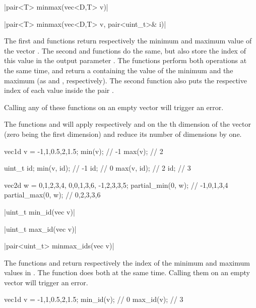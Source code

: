\cppinline|pair<T> minmax(vec<D,T> v)| 

\cppinline|pair<T> minmax(vec<D,T> v, pair<uint_t>& i)|

The first  and  functions return respectively the minimum and maximum value of the vector . The second  and  functions do the same, but also store the index of this value in the output parameter . The  functions perform both operations at the same time, and return a  containing the value of the minimum and the maximum (as  and , respectively). The second  function also puts the respective index of each value inside the pair .

Calling any of these functions on an empty vector will trigger an error.

The functions  and  will apply respectively  and  on the th dimension of the vector (zero being the first dimension) and reduce its number of dimensions by one.

\begin{example}
\begin{cppcode}
vec1d v = {-1,1,0.5,2,1.5};
min(v); // -1
max(v); // 2

uint_t id;
min(v, id); // -1
id;         // 0
max(v, id); // 2
id;         // 3

vec2d w = {{0,1,2,3,4}, {0,0,1,3,6}, {-1,2,3,3,5}};
partial_min(0, w); // {-1,0,1,3,4}
partial_max(0, w); // {0,2,3,3,6}
\end{cppcode}
\end{example}

\funcitem \cppinline|uint_t min_id(vec v)| 

\cppinline|uint_t max_id(vec v)| 

\cppinline|pair<uint_t> minmax_ids(vec v)| 

The functions  and  return respectively the index of the minimum and maximum values in . The function  does both at the same time. Calling them on an empty vector will trigger an error.

\begin{example}
\begin{cppcode}
vec1d v = {-1,1,0.5,2,1.5};
min_id(v); // 0
max_id(v); // 3
\end{cppcode}
\end{example}

